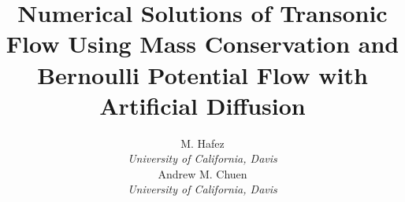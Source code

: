 \documentclass{article}
\title{Numerical Solutions of Transonic Flow Using Mass Conservation and Bernoulli Potential Flow with Artificial Diffusion}
\author{M. Hafez\\\textit{University of California, Davis}\\Andrew M. Chuen\\\textit{University of California, Davis}
}
\begin{document}
\maketitle

\begin{abstract}
	\lipsum[20]

	
	
	
	
\end{abstract}
\end{document}
